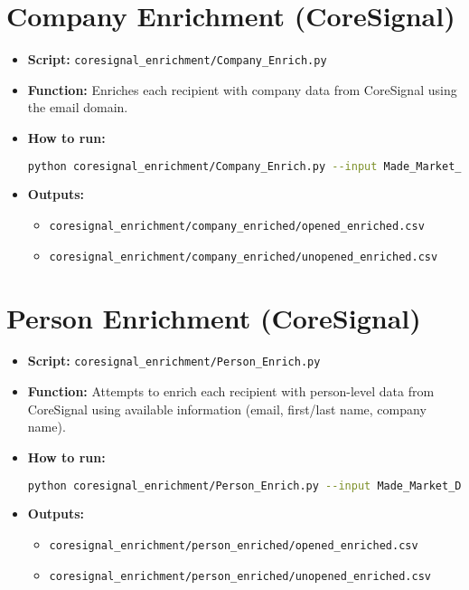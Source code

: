 \documentclass{article}
\begin{document}
\section{Company Enrichment (CoreSignal)}
\begin{itemize}
  \item \textbf{Script:} \texttt{coresignal\_enrichment/Company\_Enrich.py}
  \item \textbf{Function:} Enriches each recipient with company data from CoreSignal using the email domain.
  \item \textbf{How to run:}
\begin{lstlisting}[language=bash]
python coresignal_enrichment/Company_Enrich.py --input Made_Market_Data/opened/mademarket_2025_ISTE_opened.csv --output coresignal_enrichment/company_enriched/opened_enriched.csv
\end{lstlisting}
  \item \textbf{Outputs:}
  \begin{itemize}
    \item \texttt{coresignal\_enrichment/company\_enriched/opened\_enriched.csv}
    \item \texttt{coresignal\_enrichment/company\_enriched/unopened\_enriched.csv}
  \end{itemize}
\end{itemize}

\section{Person Enrichment (CoreSignal)}
\begin{itemize}
  \item \textbf{Script:} \texttt{coresignal\_enrichment/Person\_Enrich.py}
  \item \textbf{Function:} Attempts to enrich each recipient with person-level data from CoreSignal using available information (email, first/last name, company name).
  \item \textbf{How to run:}
\begin{lstlisting}[language=bash]
python coresignal_enrichment/Person_Enrich.py --input Made_Market_Data/opened/mademarket_2025_ISTE_opened.csv --output coresignal_enrichment/person_enriched/opened_enriched.csv
\end{lstlisting}
  \item \textbf{Outputs:}
  \begin{itemize}
    \item \texttt{coresignal\_enrichment/person\_enriched/opened\_enriched.csv}
    \item \texttt{coresignal\_enrichment/person\_enriched/unopened\_enriched.csv}
  \end{itemize}
\end{itemize}
\end{document}
